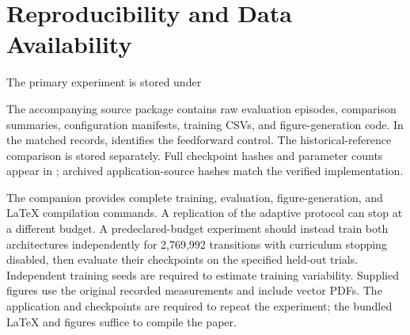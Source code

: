 \documentclass[conference]{IEEEtran}
\newcommand{\code}[1]{\texttt{\detokenize{#1}}}
\begin{document}
\section{Reproducibility and Data Availability}
The primary experiment is stored under
\begin{flushleft}\small
{}
\end{flushleft}
The accompanying source package contains raw evaluation episodes, comparison summaries, configuration manifests, training CSVs, and figure-generation code. In the matched records, \code{frozen} identifies the feedforward control. The historical-reference comparison is stored separately. Full checkpoint hashes and parameter counts appear in ; archived application-source hashes match the verified implementation.

The companion \code{BUILD.txt} provides complete training, evaluation, figure-generation, and LaTeX compilation commands. A replication of the adaptive protocol can stop at a different budget. A predeclared-budget experiment should instead train both architectures independently for 2,769,992 transitions with curriculum stopping disabled, then evaluate their checkpoints on the specified held-out trials. Independent training seeds are required to estimate training variability. Supplied figures use the original recorded measurements and include vector PDFs. The application and checkpoints are required to repeat the experiment; the bundled LaTeX and figures suffice to compile the paper.



\end{document}
